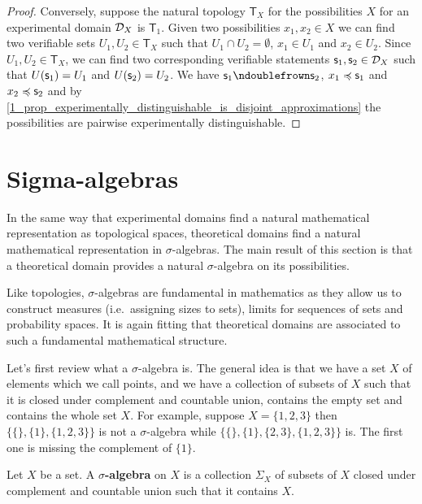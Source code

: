 \documentclass[11pt,letterpaper,fleqn]{memoir} %
\begin{document}
\begin{mathSection}
\begin{proof}
	Conversely, suppose the natural topology $\mathsf{T}_X$ for the possibilities $X$ for an experimental domain $\mathcal{D}_X$ is $\mathsf{T}_1$. Given two possibilities $x_1, x_2 \in X$ we can find two verifiable sets $U_1, U_2 \in \mathsf{T}_X$ such that $U_1 \cap U_2 = \emptyset$, $x_1 \in U_1$ and $x_2 \in U_2$. Since $U_1, U_2 \in \mathsf{T}_X$, we can find two corresponding verifiable statements $\mathsf{s}_1, \mathsf{s}_2 \in \mathcal{D}_X$ such that $U(\mathsf{s}_1) = U_1$ and $U(\mathsf{s}_2) = U_2$. We have $\stmt_1 \ncomp \stmt_2$, $x_1 \preccurlyeq \mathsf{s}_1$ and $x_2 \preccurlyeq \mathsf{s}_2$ and by \ref{1_prop_experimentally_distinguishable_is_disjoint_approximations} the possibilities are pairwise experimentally distinguishable.
\end{proof}
\end{mathSection}

\section{Sigma-algebras}

In the same way that experimental domains find a natural mathematical representation as topological spaces, theoretical domains find a natural mathematical representation in $\sigma$-algebras. The main result of this section is that a theoretical domain provides a natural $\sigma$-algebra on its possibilities.

Like topologies, $\sigma$-algebras are fundamental in mathematics as they allow us to construct measures (i.e.~assigning sizes to sets), limits for sequences of sets and probability spaces. It is again fitting that theoretical domains are associated to such a fundamental mathematical structure.

Let's first review what a $\sigma$-algebra is. The general idea is that we have a set $X$ of elements which we call points, and we have a collection of subsets of $X$ such that it is closed under complement and countable union, contains the empty set and contains the whole set $X$. For example, suppose $X = \{1,2,3\}$ then  $\{\{\},\{1\},\{1,2,3\}\}$ is not a $\sigma$-algebra while $\{\{\},\{1\}, \{2,3\},\{1,2,3\}\}$ is. The first one is missing the complement of $\{1\}$.

\begin{mathSection}
	\begin{defn}
		Let $X$ be a set. A \textbf{$\sigma$-algebra} on $X$ is a collection $\Sigma_X$ of subsets of $X$ closed under complement and countable union such that it contains $X$.
	\end{defn}
\end{mathSection}
\end{document}

